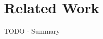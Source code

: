 \documentclass[11pt,a4paper]{article}
\begin{document}
\newpage
\section{Related Work}
\label{sec:related_work}

\newline TODO - Summary
\end{document}
